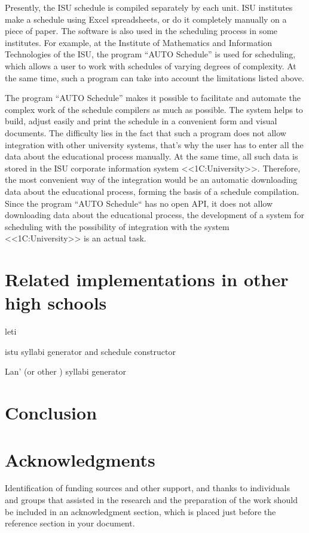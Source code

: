 \documentclass[
]{ceurart}
\begin{document}
Presently, the ISU schedule is compiled separately by each unit.  ISU institutes make a schedule using Excel spreadsheets, or do it completely manually on a piece of paper. The software is also used in the scheduling process in some institutes. For example, at the Institute of Mathematics and Information Technologies of the ISU, the program ``AUTO Schedule'' is used for scheduling, which allows a user to work with schedules of varying degrees of complexity. At the same time, such a program can take into account the limitations listed above.

The program ``AUTO Schedule'' makes it possible to facilitate and automate the complex work of the schedule compilers as much as possible. The system helps to build, adjust easily and print the schedule in a convenient form  and visual documents. The difficulty lies in the fact that such a program does not allow integration with other university systems, that's why the user has to enter all the data about the educational process manually.  At the same time, all such data is stored in the ISU corporate information system <<1C:University>>. Therefore, the most convenient way of the integration would be an automatic downloading data about the educational process, forming the basis of a schedule compilation. Since the program ``AUTO Schedule`` has no open API, it does not allow downloading data about the educational process, the development of a system for scheduling with the possibility of integration with the system <<1C:University>> is an actual task.


\section{Related implementations in other high schools}

leti

istu syllabi generator and schedule constructor

Lan' (or other ) syllabi generator

\section*{Conclusion}


\section{Acknowledgments}
\begin{acknowledgments}
Identification of funding sources and other support, and thanks to
individuals and groups that assisted in the research and the
preparation of the work should be included in an acknowledgment
section, which is placed just before the reference section in your
document.
\end{acknowledgments}
\end{document}
